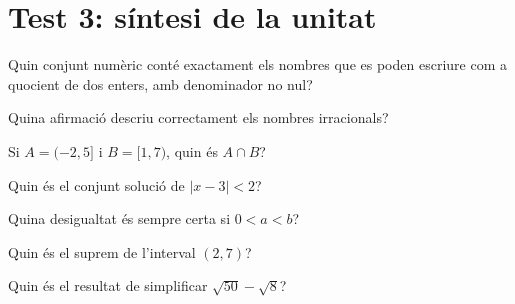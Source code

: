 \section{Test 3: síntesi de la unitat}

\begin{enumerate}
\pregunta Quin conjunt numèric conté exactament els nombres que es poden escriure com a quocient de dos enters, amb denominador no nul?
\begin{enumerate}
\end{enumerate}
\feedback


\pregunta Quina afirmació descriu correctament els nombres irracionals?
\begin{enumerate}
\end{enumerate}
\feedback


\pregunta Si $A=(-2,5]$ i $B=[1,7)$, quin és $A\cap B$?
\begin{enumerate}
\end{enumerate}
\feedback


\pregunta Quin és el conjunt solució de $|x-3|<2$?
\begin{enumerate}
\end{enumerate}
\feedback


\pregunta Quina desigualtat és sempre certa si $0<a<b$?
\begin{enumerate}
\end{enumerate}
\feedback


\pregunta Quin és el suprem de l’interval $(2,7)$?
\begin{enumerate}
\end{enumerate}
\feedback


\pregunta Quin és el resultat de simplificar $\sqrt{50}-\sqrt{8}$?
\begin{enumerate}
\end{enumerate}
\feedback



\end{enumerate}
